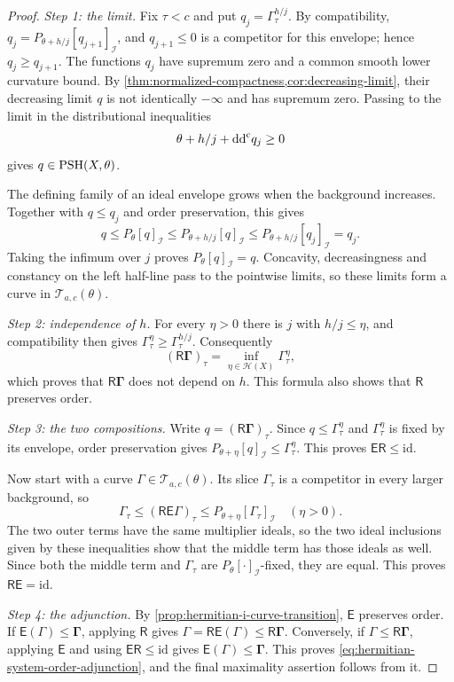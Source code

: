 \begin{proof}
\emph{Step 1: the limit.} Fix $\tau<c$ and put $q_j=\Gamma^{h/j}_\tau$. By compatibility, $q_j=P_{\theta+h/j}[q_{j+1}]_{\mathcal I}$, and $q_{j+1}\leq0$ is a competitor for this envelope; hence $q_j\geq q_{j+1}$. The functions $q_j$ have supremum zero and a common smooth lower curvature bound. By \cref{thm:normalized-compactness,cor:decreasing-limit}, their decreasing limit $q$ is not identically $-\infty$ and has supremum zero. Passing to the limit in the distributional inequalities
\[
 \theta+h/j+\mathrm{dd}^{\mathrm{c}} q_j\geq0
\]
gives $q\in\mathrm{PSH}(X,\theta)$.

The defining family of an ideal envelope grows when the background increases. Together with $q\leq q_j$ and order preservation, this gives
\[
 q\leq P_\theta[q]_{\mathcal I}
 \leq P_{\theta+h/j}[q]_{\mathcal I}
 \leq P_{\theta+h/j}[q_j]_{\mathcal I}=q_j.
\]
Taking the infimum over $j$ proves $P_\theta[q]_{\mathcal I}=q$. Concavity, decreasingness and constancy on the left half-line pass to the pointwise limits, so these limits form a curve in $\mathscr T_{a,c}(\theta)$.

\emph{Step 2: independence of $h$.} For every $\eta>0$ there is $j$ with $h/j\leq\eta$, and compatibility then gives $\Gamma^\eta_\tau\geq\Gamma^{h/j}_\tau$. Consequently
\[
 (\mathsf R\boldsymbol\Gamma)_\tau
 =\inf_{\eta\in\mathscr H(X)}\Gamma^\eta_\tau,
\]
which proves that $\mathsf R\boldsymbol\Gamma$ does not depend on $h$. This formula also shows that $\mathsf R$ preserves order.

\emph{Step 3: the two compositions.} Write $q=(\mathsf R\boldsymbol\Gamma)_\tau$. Since $q\leq\Gamma^\eta_\tau$ and $\Gamma^\eta_\tau$ is fixed by its envelope, order preservation gives $P_{\theta+\eta}[q]_{\mathcal I}\leq\Gamma^\eta_\tau$. This proves $\mathsf E\mathsf R\leq\mathrm{id}$.

Now start with a curve $\Gamma\in\mathscr T_{a,c}(\theta)$. Its slice $\Gamma_\tau$ is a competitor in every larger background, so
\[
 \Gamma_\tau\leq(\mathsf R\mathsf E\Gamma)_\tau
                  \leq P_{\theta+\eta}[\Gamma_\tau]_{\mathcal I}
 \quad(\eta>0).
\]
The two outer terms have the same multiplier ideals, so the two ideal inclusions given by these inequalities show that the middle term has those ideals as well. Since both the middle term and $\Gamma_\tau$ are $P_\theta[\cdot]_{\mathcal I}$-fixed, they are equal. This proves $\mathsf R\mathsf E=\mathrm{id}$.

\emph{Step 4: the adjunction.} By \cref{prop:hermitian-i-curve-transition}, $\mathsf E$ preserves order. If $\mathsf E(\Gamma)\leq\boldsymbol\Gamma$, applying $\mathsf R$ gives $\Gamma=\mathsf R\mathsf E(\Gamma)\leq\mathsf R\boldsymbol\Gamma$. Conversely, if $\Gamma\leq\mathsf R\boldsymbol\Gamma$, applying $\mathsf E$ and using $\mathsf E\mathsf R\leq\mathrm{id}$ gives $\mathsf E(\Gamma)\leq\boldsymbol\Gamma$. This proves \eqref{eq:hermitian-system-order-adjunction}, and the final maximality assertion follows from it.
\end{proof}

